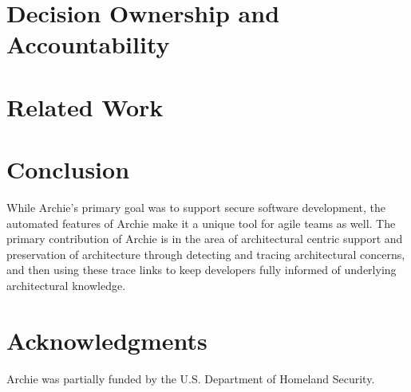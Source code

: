 \documentclass[lnbip]{svmultln}
\begin{document}
\section{Decision Ownership and Accountability}



\section{Related Work}




\section{Conclusion}
While Archie's primary goal was to support secure software development, the automated features of Archie make it a unique tool for agile teams as well. The primary contribution of Archie is in the area of architectural centric support and preservation of architecture through detecting and tracing architectural concerns, and then using these trace links to keep developers fully informed of underlying architectural knowledge.

\section{Acknowledgments}
Archie was partially funded by the U.S. Department of Homeland Security.



\end{document}
